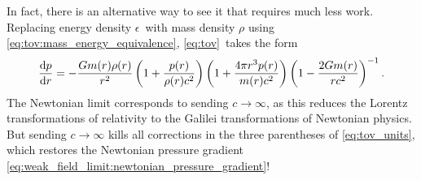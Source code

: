 In fact, there is an alternative way to see it that requires much less work.
Replacing energy density $\epsilon$ with mass density $\rho$ using \cref{eq:tov:mass_energy_equivalence}, \cref{eq:tov} takes the form
\begin{equation}
	\odv{p}{r} = -\frac{G m(r) \rho(r)}{r^2} \left( 1 + \frac{p(r)}{\rho(r) c^2} \right) \left( 1 + \frac{4 \pi r^3 p(r)}{m(r) c^2} \right) \left( 1 - \frac{2 G m(r)}{r c^2} \right)^{-1} .
	\label{eq:tov_units}
\end{equation}
The Newtonian limit corresponds to sending $c \rightarrow \infty$, as this reduces the Lorentz transformations of relativity to the Galilei transformations of Newtonian physics.
But sending $c \rightarrow \infty$ kills all corrections in the three parentheses of \cref{eq:tov_units}, which restores the Newtonian pressure gradient \eqref{eq:weak_field_limit:newtonian_pressure_gradient}!
